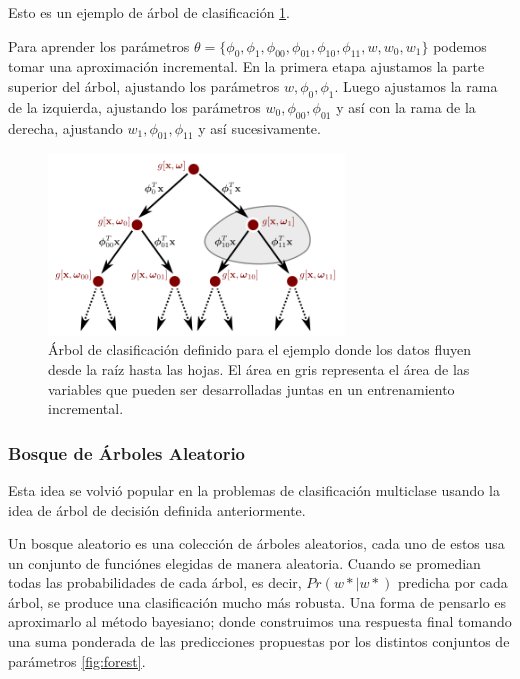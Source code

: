 \documentclass[letter,12pt]{report}
\begin{document}
Esto es un ejemplo de árbol de clasificación \ref{fig:tree}.

Para aprender los parámetros $\theta = \{\phi_0, \phi_1, \phi_{00}, \phi_{01}, \phi_{10},
\phi_{11}, w, w_0, w_1\}$ podemos tomar una aproximación incremental. En la primera etapa
ajustamos la parte superior del árbol, ajustando los parámetros $w, \phi_0, \phi_1$.
Luego ajustamos la rama de la izquierda, ajustando los parámetros $w_0, \phi_{00},
\phi_{01}$ y así con la rama de la derecha, ajustando $w_1, \phi_{01}, \phi_{11}$ y así
sucesivamente.

\begin{figure}[H]
    \centering
    \includegraphics[width=0.7\textwidth]{tree}
    \caption{Árbol de clasificación definido para el ejemplo donde los datos fluyen desde
    la raíz hasta las hojas. El área en gris representa el área de las variables que
pueden ser desarrolladas juntas en un entrenamiento incremental.}
    \label{fig:tree}
\end{figure}

\subsubsection{Bosque de Árboles Aleatorio}
Esta idea se volvió popular en la problemas de clasificación multiclase usando la idea
de árbol de decisión definida anteriormente.

Un bosque aleatorio \cite{Forest} es una colección de árboles aleatorios, cada uno de
estos usa un conjunto de funciónes elegidas de manera aleatoria. Cuando se promedian
todas las probabilidades de cada árbol, es decir, $Pr(w*|w*)$ predicha por cada árbol, se
produce una clasificación mucho más robusta. Una forma de pensarlo es aproximarlo al
método bayesiano; donde construimos una respuesta final tomando una suma ponderada de las
predicciones propuestas por los distintos conjuntos de parámetros \ref{fig:forest}.
\end{document}
